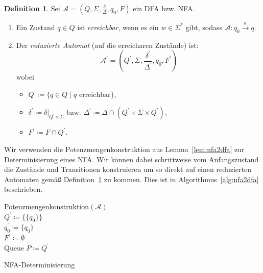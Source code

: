 \documentclass[11pt, a4paper]{article}
\theoremstyle{definition}
\newtheorem{definition}{Definition}[section]
\theoremstyle{plain}
\numberwithin{equation}{section}
\newcommand{\reaches}[1]{\overset{#1}{\rightarrow}}
\begin{document}
\begin{definition}\label{def:reduced_automaton}
	Sei \( \mathcal{A} = (Q, \Sigma, \frac{\delta}{\Delta}, q_0, F) \) ein DFA bzw. NFA.
	\begin{enumerate}
		\item Ein Zustand \( q \in Q \) ist \textit{erreichbar}, wenn es ein \( w \in \Sigma^\ast \) gibt, sodass \( \mathcal{A}: q_0 \reaches{w} q \).
		\item Der \textit{reduzierte Automat} (auf die erreicharen Zustände) ist:
			\[
				\mathcal{A}^\prime = (Q^\prime, \Sigma, \frac{\delta^\prime}{\Delta^\prime}, q_0, F^\prime)
			\]
			wobei
			\begin{itemize}
				\item \( Q^\prime \coloneqq \{ q \in Q \mid q \text{ erreichbar} \} \),
				\item \( \delta^\prime \coloneqq \left. \delta \right|_{Q^\prime \times \Sigma} \) bzw. \( \Delta^\prime \coloneqq \Delta \cap (Q^\prime \times \Sigma \times Q^\prime) \),
				\item \( F^\prime \coloneqq F \cap Q^\prime\).
			\end{itemize}
	\end{enumerate}
\end{definition}
Wir verwenden die Potenzmengenkonstruktion aus Lemma~\ref{lem:nfa2dfa} zur Determinisierung eines NFA. Wir können dabei schrittweise vom Anfangszustand die Zustände und Transitionen konstruieren um so direkt auf einen reduzierten Automaten gemäß Definition~\ref{def:reduced_automaton} zu kommen. Dies ist in Algorithmus~\ref{alg:nfa2dfa} beschrieben.
\begin{algorithm}
	\underline{Potenzmengenkonstruktion}{$(\mathcal{A})$}\\
	$Q^\prime \coloneqq \{\{q_0\}\}$\\
	$q_0^\prime \coloneqq \{q_0\}$\\
	$F^\prime \coloneqq \emptyset$\\
	Queue $P \coloneqq Q^\prime$\\
	
	\caption{NFA-Determinisierung}
	\label{alg:nfa2dfa}
\end{algorithm}
\end{document}
